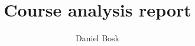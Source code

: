 \documentclass{article}
\begin{document}
\title{%
  Course analysis report
}
\author{Daniel Bosk}

\maketitle

\begin{abstract}
  
\end{abstract}



\printbibliography
\end{document}
